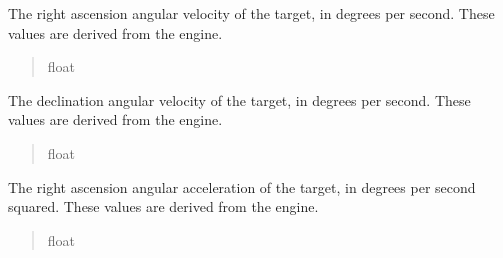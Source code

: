 \documentclass[letterpaper,11pt,english]{sphinxmanual}
\begin{document}
\begin{savenotes}
\begin{fulllineitems}
\begin{savenotes}\begin{fulllineitems}
\label{\detokenize{code/opihiexarata.propagate.solution:opihiexarata.propagate.solution.PropagativeSolution.ra_velocity}}
\pysigstartsignatures
{}
\pysigstopsignatures
\sphinxAtStartPar
The right ascension angular velocity of the target, in degrees per
second. These values are derived from the engine.
\begin{quote}\begin{description}
\sphinxAtStartPar
float

\end{description}\end{quote}

\end{fulllineitems}\end{savenotes}


\begin{savenotes}\begin{fulllineitems}
\label{\detokenize{code/opihiexarata.propagate.solution:opihiexarata.propagate.solution.PropagativeSolution.dec_velocity}}
\pysigstartsignatures
{}
\pysigstopsignatures
\sphinxAtStartPar
The declination angular velocity of the target, in degrees per
second. These values are derived from the engine.
\begin{quote}\begin{description}
\sphinxAtStartPar
float

\end{description}\end{quote}

\end{fulllineitems}\end{savenotes}


\begin{savenotes}\begin{fulllineitems}
\label{\detokenize{code/opihiexarata.propagate.solution:opihiexarata.propagate.solution.PropagativeSolution.ra_acceleration}}
\pysigstartsignatures
{}
\pysigstopsignatures
\sphinxAtStartPar
The right ascension angular acceleration of the target, in degrees per
second squared. These values are derived from the engine.
\begin{quote}\begin{description}
\sphinxAtStartPar
float


\end{description}
\end{quote}
\end{fulllineitems}
\end{savenotes}
\end{fulllineitems}
\end{savenotes}
\end{document}
